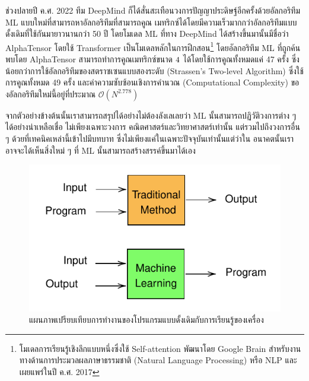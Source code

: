 ช่วงปลายปี ค.ศ. 2022 ทีม DeepMind ก็ได้สั่นสะเทือนวงการปัญญาประดิษฐ์อีกครั้งด้วยอัลกอริทึม ML แบบใหม่ที่สามารถหาอัลกอริทึมที่สามารถคูณ%
เมทริกซ์ได้โดยมีความเร็วมากกว่าอัลกอริทึมแบบดั้งเดิมที่ใช้กันมายาวนานกว่า 50 ปี โดยโมเดล ML ที่ทาง DeepMind ได้สร้างขึ้นมานั้นมีชื่อว่า 
AlphaTensor โดยใช้ Transformer\autocite{vaswani2017} เป็นโมเดลหลักในการฝึกสอน\footnote{โมเดลการเรียนรู้เชิงลึกแบบหนึ่งซึ่งใช้ 
Self-attention พัฒนาโดย Google Brain สำหรับงานทางด้านการประมวลผลภาษาธรรมชาติ (Natural Language Processing) หรือ 
NLP และเผยแพร่ในปี ค.ศ. 2017} โดยอัลกอริทึม ML ที่ถูกค้นพบโดย AlphaTensor สามารถทำการคูณเมทริกซ์ขนาด $4 \time 4$ 
ได้โดยใช้การคูณทั้งหมดแค่ 47 ครั้ง ซึ่งน้อยกว่าการใช้อัลกอริทึมของสตราซเซนแบบสองระดับ (Strassen's Two-level Algorithm) 
ซึ่งใช้การคูณทั้งหมด 49 ครั้ง\autocite{strassen1969}  และค่าความซับซ้อนเชิงการคำนวณ (Computational Complexity) 
ของอัลกอริทึมใหม่นี้อยู่ที่ประมาณ ${\mathcal{O}}({N}^{2.778})$ 

จากตัวอย่างข้างต้นนั้นเราสามารถสรุปได้อย่างไม่ต้องลังเลเลยว่า ML นั้นสามารถปฏิวัติวงการต่าง ๆ ได้อย่างน่าเหลือเชื่อ ไม่เพียงเฉพาะวงการ%
คณิตศาสตร์และวิทยาศาสตร์เท่านั้น แต่รวมไปถึงวงการอื่น ๆ ด้วยที่เทคนิคเหล่านี้เข้าไปมีบทบาท ซึ่งไม่เพียงแค่ในเฉพาะปัจจุบันเท่านั้นแต่ว่าใน%
อนาคตนั้นเราอาจจะได้เห็นสิ่งใหม่ ๆ ที่ ML นั้นสามารถสร้างสรรค์ขึ้นมาได้เอง

\begin{figure}[htbp]
    \centering
    \includegraphics[scale=1]{fig/ML-concept.pdf}
    \caption{แผนภาพเปรียบเทียบการทำงานของโปรแกรมแบบดั้งเดิมกับการเรียนรู้ของเครื่อง}
    \label{fig:ml_paradigm}
\end{figure}

